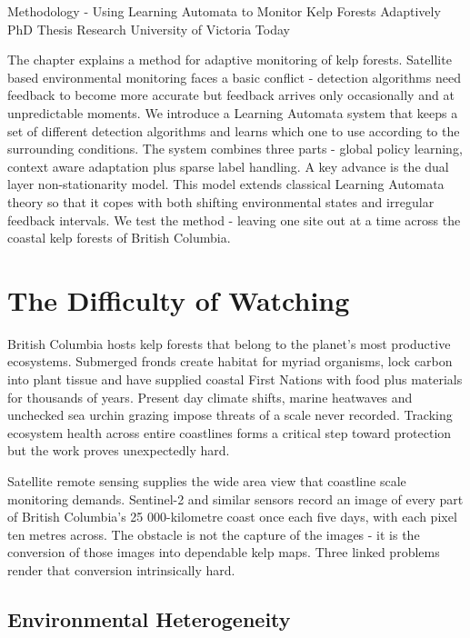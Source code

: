 \documentclass[11pt,a4paper]{article}
\begin{document}
Methodology - Using Learning Automata to Monitor Kelp Forests Adaptively 
PhD Thesis Research 
University of Victoria 
Today

The chapter explains a method for adaptive monitoring of kelp forests. Satellite based environmental monitoring faces a basic conflict - detection algorithms need feedback to become more accurate but feedback arrives only occasionally and at unpredictable moments. We introduce a Learning Automata system that keeps a set of different detection algorithms and learns which one to use according to the surrounding conditions. The system combines three parts - global policy learning, context aware adaptation plus sparse label handling. A key advance is the dual layer non-stationarity model. This model extends classical Learning Automata theory so that it copes with both shifting environmental states and irregular feedback intervals. We test the method - leaving one site out at a time across the coastal kelp forests of British Columbia.

\tableofcontents
\newpage


\section{The Difficulty of Watching}
\label{sec:challenge}

British Columbia hosts kelp forests that belong to the planet's most productive ecosystems. Submerged fronds create habitat for myriad organisms, lock carbon into plant tissue and have supplied coastal First Nations with food plus materials for thousands of years. Present day climate shifts, marine heatwaves and unchecked sea urchin grazing impose threats of a scale never recorded. Tracking ecosystem health across entire coastlines forms a critical step toward protection but the work proves unexpectedly hard.

Satellite remote sensing supplies the wide area view that coastline scale monitoring demands. Sentinel-2 and similar sensors record an image of every part of British Columbia's 25 000-kilometre coast once each five days, with each pixel ten metres across. The obstacle is not the capture of the images - it is the conversion of those images into dependable kelp maps. Three linked problems render that conversion intrinsically hard.

\subsection{Environmental Heterogeneity}
\end{document}
